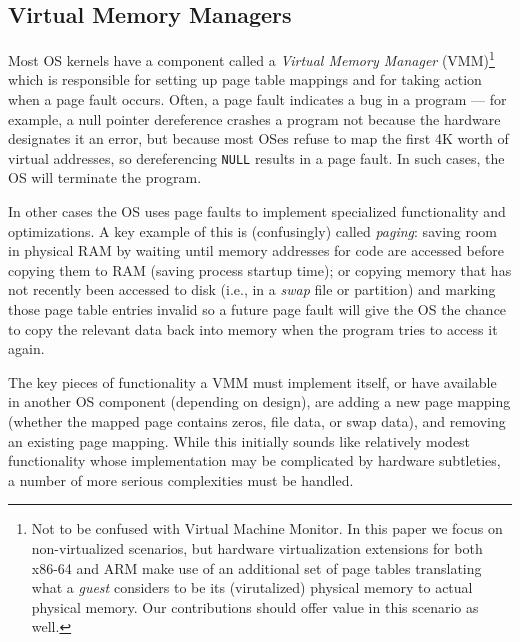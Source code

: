 \subsection{Virtual Memory Managers}
\label{sec:backgroundonvmm}
Most OS kernels have a component called a \emph{Virtual Memory Manager} (VMM)\footnote{Not to be confused with Virtual Machine Monitor. In this paper we focus on non-virtualized scenarios, but hardware virtualization extensions for both x86-64 and ARM make use of an additional set of page tables translating what a \emph{guest} considers to be its (virutalized) physical memory to actual physical memory. Our contributions should offer value in this scenario as well.}
which is responsible for setting up page table mappings and for taking action when a page fault occurs. Often, a page fault indicates a bug in a program --- for example, a null pointer dereference crashes a program not because the hardware designates it an error, but because most OSes refuse to map the first 4K worth of virtual addresses, so dereferencing \texttt{NULL} results in a page fault. In such cases, the OS will terminate the program.

In other cases the OS uses page faults to implement specialized functionality and optimizations. A key example of this is (confusingly) called \emph{paging}: saving room in physical RAM by waiting until memory addresses for code are accessed before copying them to RAM (saving process startup time); or copying memory that has not recently been accessed to disk (i.e., in a \emph{swap} file or partition) and marking those page table entries invalid so a future page fault will give the OS the chance to copy the relevant data back into memory when the program tries to access it again.

The key pieces of functionality a VMM must implement itself, or have available in another OS component (depending on design), are
adding a new page mapping (whether the mapped page contains zeros, file data, or swap data), and removing an existing page mapping.
While this initially sounds like relatively modest functionality whose implementation may be complicated by hardware subtleties, a number of more serious complexities must be handled.

